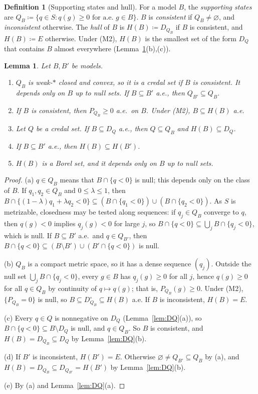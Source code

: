 \documentclass[11pt]{article}
\newtheorem{lemma}[theorem]{Lemma}
\theoremstyle{definition}
\newtheorem{definition}[theorem]{Definition}
\begin{document}
\begin{definition}[Supporting states and hull]\label{def:hull}
For a model $B$, the \emph{supporting states} are $Q_B\coloneqq\{q\in S:q(g)\ge0\text{ for a.e.\ }g\in B\}$. $B$ is \emph{consistent} if $Q_B\ne\varnothing$, and \emph{inconsistent} otherwise. The \emph{hull} of $B$ is $H(B)\coloneqq D_{Q_B}$ if $B$ is consistent, and $H(B)\coloneqq E$ otherwise. {\color{red}Under (M2), $H(B)$ is the smallest set of the form $D_Q$ that contains $B$ almost everywhere (Lemma~\ref{lem:hull}(b),(c)).}
\end{definition}

\begin{lemma}\label{lem:hull}
Let $B,B'$ be models.
\begin{enumerate}[label=(\alph*)]
\item $Q_B$ is weak-$\ast$ closed and convex, so it is a credal set if $B$ is consistent. It depends only on $B$ up to null sets. If $B\subseteq B'$ a.e., then $Q_{B'}\subseteq Q_B$.
\item If $B$ is consistent, then $P_{Q_B}\ge0$ a.e.\ on $B$. Under (M2), $B\subseteq H(B)$ a.e.
\item Let $Q$ be a credal set. If $B\subseteq D_Q$ a.e., then $Q\subseteq Q_B$ and $H(B)\subseteq D_Q$.
\item If $B\subseteq B'$ a.e., then $H(B)\subseteq H(B')$.
\item $H(B)$ is a Borel set, and it depends only on $B$ up to null sets.
\end{enumerate}
\end{lemma}
\begin{proof}
(a) $q\in Q_B$ means that $B\cap\{q<0\}$ is null; this depends only on the class of $B$. If $q_1,q_2\in Q_B$ and $0\le\lambda\le1$, then $B\cap\{(1-\lambda)q_1+\lambda q_2<0\}\subseteq(B\cap\{q_1<0\})\cup(B\cap\{q_2<0\})$. As $S$ is metrizable, closedness may be tested along sequences: if $q_j\in Q_B$ converge to $q$, then $q(g)<0$ implies $q_j(g)<0$ for large $j$, so $B\cap\{q<0\}\subseteq\bigcup_jB\cap\{q_j<0\}$, which is null. If $B\subseteq B'$ a.e.\ and $q\in Q_{B'}$, then $B\cap\{q<0\}\subseteq(B\setminus B')\cup(B'\cap\{q<0\})$ is null.

(b) $Q_B$ is a compact metric space, so it has a dense sequence $(q_j)$. Outside the null set $\bigcup_jB\cap\{q_j<0\}$, every $g\in B$ has $q_j(g)\ge0$ for all $j$, hence $q(g)\ge0$ for all $q\in Q_B$ by continuity of $q\mapsto q(g)$; that is, $P_{Q_B}(g)\ge0$. Under (M2), $\{P_{Q_B}=0\}$ is null, so $B\subseteq D^\circ_{Q_B}\subseteq H(B)$ a.e. If $B$ is inconsistent, $H(B)=E$.

(c) Every $q\in Q$ is nonnegative on $D_Q$ (Lemma~\ref{lem:DQ}(a)), so $B\cap\{q<0\}\subseteq B\setminus D_Q$ is null, and $q\in Q_B$. So $B$ is consistent, and $H(B)=D_{Q_B}\subseteq D_Q$ by Lemma~\ref{lem:DQ}(b).

(d) If $B'$ is inconsistent, $H(B')=E$. Otherwise $\varnothing\ne Q_{B'}\subseteq Q_B$ by (a), and $H(B)=D_{Q_B}\subseteq D_{Q_{B'}}=H(B')$ by Lemma~\ref{lem:DQ}(b).

(e) By (a) and Lemma~\ref{lem:DQ}(a).
\end{proof}
\end{document}
